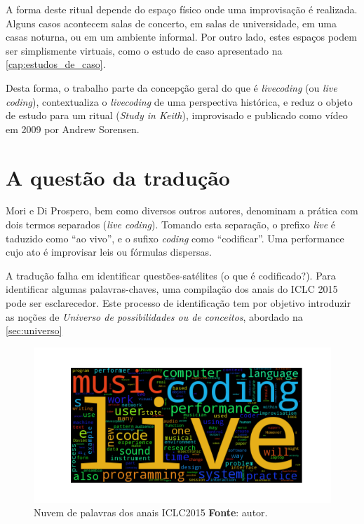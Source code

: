 A forma deste ritual depende do espaço físico onde uma improvisação é realizada. Alguns casos acontecem salas de concerto, em salas de universidade, em uma casas noturna, ou em um ambiente informal. Por outro lado, estes espaços podem ser simplismente virtuais, como o estudo de caso apresentado na \autoref{cap:estudos_de_caso}.

Desta forma, o trabalho parte da concepção geral do que é \emph{livecoding} (ou \emph{live coding}), contextualiza o \emph{livecoding} de uma perspectiva histórica, e reduz o objeto de estudo para um ritual (\emph{Study in Keith}), improvisado e publicado como vídeo em 2009 por Andrew Sorensen.


\section{A questão da tradução}\label{sec:traducao}

Mori e Di Prospero, bem como diversos outros autores, denominam a prática com dois termos separados (\emph{live coding}). Tomando esta separação, o prefixo \emph{live} é taduzido como ``ao vivo'', e o sufixo \emph{coding} como ``codificar''. Uma performance cujo ato é improvisar leis ou fórmulas dispersas.

A tradução falha em identificar questões-satélites (o que é codificado?). Para identificar algumas palavras-chaves, uma compilação dos anais do ICLC 2015 \cite{ICLC2015} pode ser esclarecedor. Este processo de identificação tem por objetivo introduzir as noções de \emph{Universo de possibilidades ou de conceitos}, abordado na \autoref{sec:universo}

\begin{figure}[!h]
\begin{center}
\centering
\includegraphics[scale=0.71]{./imagens/livecoding_cloud1.png}
\caption{Nuvem de palavras dos anais ICLC2015 \textbf{Fonte}: autor.}
\label{fig:nuvemlivecoding}
\end{center}
\end{figure}

